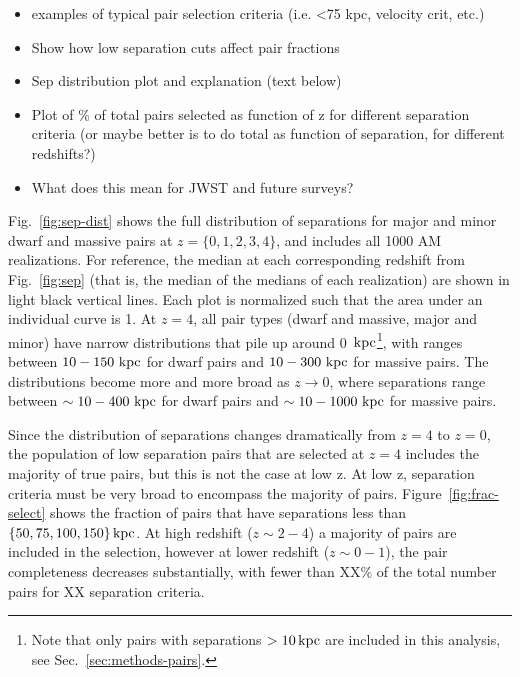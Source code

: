 \documentclass[twocolumn]{aastex631}
\begin{document}
    \begin{itemize}
        \item examples of typical pair selection criteria (i.e. <75 kpc, velocity crit, etc.)
        \item Show how low separation cuts affect pair fractions      
        \item Sep distribution plot and explanation (text below) 
        \item Plot of \% of total pairs selected as function of z for different separation criteria (or maybe better is to do total as function of separation, for different redshifts?) 
        \item What does this mean for JWST and future surveys?
    \end{itemize}
    
    
Fig.~\ref{fig:sep-dist} shows the full distribution of separations for major and minor dwarf and massive pairs at $z=\{0,1,2,3,4\}$, and includes all 1000 AM realizations. 
For reference, the median at each corresponding redshift from Fig.~\ref{fig:sep} (that is, the median of the medians of each realization) are shown in light black vertical lines.
Each plot is normalized such that the area under an individual curve is 1.
At $z=4$, all pair types (dwarf and massive, major and minor) have narrow distributions that pile up around 0 $\mathrm{\,kpc}$\footnote{Note that only pairs with separations $>10\mathrm{\,kpc}$ are included in this analysis, see Sec.~\ref{sec:methods-pairs}.}, with ranges between $10-150\,\mathrm{\,kpc}$ for dwarf pairs and $10-300\,\mathrm{\,kpc}$ for massive pairs. 
The distributions become more and more broad as $z\to0$, where separations range between $\sim10-400\,\mathrm{\,kpc}$ for dwarf pairs and $\sim10-1000\,\mathrm{\,kpc}$ for massive pairs.

Since the distribution of separations changes dramatically from $z=4$ to $z=0$, the population of low separation pairs that are selected at $z=4$ includes the majority of true pairs, but this is not the case at low z. 
At low z, separation criteria must be very broad to encompass the majority of pairs. 
Figure~\ref{fig:frac-select} shows the fraction of pairs that have separations less than $\{50, 75, 100, 150\}\mathrm{\,kpc}$.
At high redshift ($z\sim2-4$) a majority of pairs are included in the selection, however at lower redshift ($z\sim0-1$), the pair completeness decreases substantially, with fewer than XX\% of the total number pairs for XX separation criteria. 
\end{document}
